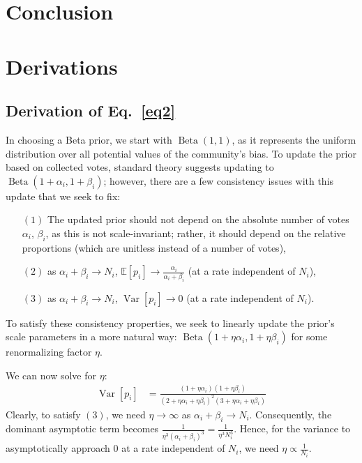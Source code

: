 \documentclass[format=acmsmall, review=true, screen=true, anonymous=true]{acmart}
\begin{document}
\section{Conclusion}
\label{sec:conclusion}

\appendix
\section{Derivations}
\label{sec:derivation}


\subsection{Derivation of Eq.~\eqref{eq2}}
In choosing a Beta prior, we start with $\operatorname{Beta}(1,1)$, as it represents the uniform distribution over all potential values of the community's bias.  To update the prior based on collected votes, standard theory suggests updating to $\operatorname{Beta}(1+\alpha_i,1+\beta_i)$; however, there are a few consistency issues with this update that we seek to fix:
\begin{itemize}
\item[$(1)$] The updated prior should not depend on the absolute number of votes $\alpha_i$, $\beta_i$, as this is not scale-invariant; rather, it should depend on the relative proportions (which are unitless instead of a number of votes),
\item[$(2)$] as $\alpha_i + \beta_i \rightarrow N_i$, $\mathbb{E}[p_i] \rightarrow \frac{\alpha_i}{\alpha_i+\beta_i}$ (at a rate independent of $N_i$),
\item[$(3)$] as $\alpha_i + \beta_i \rightarrow N_i$, $\operatorname{Var}[p_i] \rightarrow 0$ (at a rate independent of $N_i$).
\end{itemize}
To satisfy these consistency properties, we seek to linearly update the prior's scale parameters in a more natural way: $\operatorname{Beta}(1+\eta\alpha_i,1+\eta\beta_i)$ for some renormalizing factor $\eta$.

We can now solve for $\eta$:
\begin{align*}
\operatorname{Var}[p_i] &= \frac{(1+\eta\alpha_i)(1+\eta\beta_i)}{(2+\eta\alpha_i+\eta\beta_i)^2(3+\eta\alpha_i+\eta\beta_i)}
\end{align*}
Clearly, to satisfy $(3)$, we need $\eta \rightarrow \infty$ as $\alpha_i + \beta_i \rightarrow N_i$.  Consequently, the dominant asymptotic term becomes $\frac{1}{\eta^3 (\alpha_i + \beta_i)^3} = \frac{1}{\eta^3 N_i^3}$.  Hence, for the variance to asymptotically approach $0$ at a rate independent of $N_i$, we need $\eta \propto \frac{1}{N_i}$.
\end{document}
